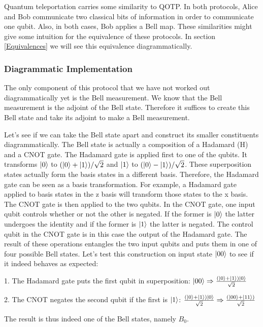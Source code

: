 \documentclass[]{article}
\begin{document}
Quantum teleportation carries some similarity to QOTP. In both protocols, Alice and Bob communicate two classical bits of information in order to communicate one qubit. Also, in both cases, Bob applies a Bell map. These similarities might give some intuition for the equivalence of these protocols. In section \ref{Equivalences} we will see this equivalence diagrammatically.

\subsubsection{Diagrammatic Implementation}

The only component of this protocol that we have not worked out diagrammatically yet is the Bell measurement. We know that the Bell measurement is the adjoint of the Bell state. Therefore it suffices to create this Bell state and take its adjoint to make a Bell measurement.

Let's see if we can take the Bell state apart and construct its smaller constituents diagrammatically. The Bell state is actually a composition of a Hadamard (H) and a CNOT gate. The Hadamard gate is applied first to one of the qubits. It transforms $\ket{0}$ to  $(\ket{0} + \ket{1})/\sqrt{2}$ and $\ket{1}$ to $(\ket{0} - \ket{1})/\sqrt{2}$. These superposition states actually form the basis states in a different basis. Therefore, the Hadamard gate can be seen as a basis transformation. For example, a Hadamard gate applied to basis states in the z basis will transform those states to the x basis. The CNOT gate is then applied to the two qubits. In the CNOT gate, one input qubit controls whether or not the other is negated. If the former is $\ket{0}$ the latter undergoes the identity and if the former is $\ket{1}$ the latter is negated. The control qubit in the CNOT gate is in this case the output of the Hadamard gate. The result of these operations entangles the two input qubits and puts them in one of four possible Bell states. Let's test this construction on input state $\ket{00}$ to see if it indeed behaves as expected:

1. The Hadamard gate puts the first qubit in superposition: $\ket{00} \Rightarrow \frac{(\ket{0} + \ket{1})\ket{0}}{\sqrt{2}}$

2. The CNOT negates the second qubit if the first is $\ket{1}$: $\frac{(\ket{0} + \ket{1})\ket{0}}{\sqrt{2}} \Rightarrow \frac{(\ket{00} + \ket{11})}{\sqrt{2}}$

The result is thus indeed one of the Bell states, namely $B_0$.
\end{document}
